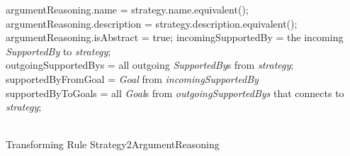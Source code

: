 \begin{algorithm}[ht!]
{		argumentReasoning.name = strategy.name.equivalent();\\
		argumentReasoning.description = strategy.description.equivalent();\\
		 {
			argumentReasoning.isAbstract = true;
		}
		\Let incomingSupportedBy = the incoming \textit{SupportedBy} to \textit{strategy};\\
		\Let outgoingSupportedBys = all outgoing \textit{SupportedBy}s from \textit{strategy};\\
		\Let supportedByFromGoal = \textit{Goal} from \textit{incomingSupportedBy}\\
		\Let supportedByToGoals = all \textit{Goal}s from \textit{outgoingSupportedBys} that connects to \textit{strategy};\\
	}
	\
	\caption{Transforming Rule Strategy2ArgumentReasoning}
	\label{alg:s2ar}
\end{algorithm}


